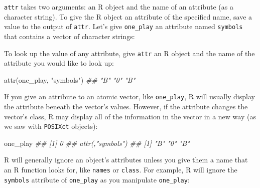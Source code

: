 \documentclass[
  letterpaper,
  DIV=11,
  numbers=noendperiod]{scrbook}
\newenvironment{Shaded}{\begin{snugshade}}{\end{snugshade}}
\newcommand{\DocumentationTok}[1]{\textcolor[rgb]{0.37,0.37,0.37}{\textit{#1}}}
\newcommand{\FunctionTok}[1]{\textcolor[rgb]{0.28,0.35,0.67}{#1}}
\newcommand{\NormalTok}[1]{\textcolor[rgb]{0.00,0.23,0.31}{#1}}
\newcommand{\OtherTok}[1]{\textcolor[rgb]{0.00,0.23,0.31}{#1}}
\newcommand{\StringTok}[1]{\textcolor[rgb]{0.13,0.47,0.30}{#1}}
\begin{document}
\texttt{attr} takes two arguments: an R object and the name of an
attribute (as a character string). To give the R object an attribute of
the specified name, save a value to the output of \texttt{attr}. Let's
give \texttt{one\_play} an attribute named \texttt{symbols} that
contains a vector of character strings:

\begin{Shaded}
\end{Shaded}

To look up the value of any attribute, give \texttt{attr} an R object
and the name of the attribute you would like to look up:

\begin{Shaded}
\begin{Highlighting}[]
\FunctionTok{attr}\NormalTok{(one\_play, }\StringTok{"symbols"}\NormalTok{)}
\DocumentationTok{\#\# "B" "0" "B"}
\end{Highlighting}
\end{Shaded}

If you give an attribute to an atomic vector, like \texttt{one\_play}, R
will usually display the attribute beneath the vector's values. However,
if the attribute changes the vector's class, R may display all of the
information in the vector in a new way (as we saw with \texttt{POSIXct}
objects):

\begin{Shaded}
\begin{Highlighting}[]
\NormalTok{one\_play}
\DocumentationTok{\#\# [1] 0}
\DocumentationTok{\#\# attr(,"symbols")}
\DocumentationTok{\#\# [1] "B" "0" "B"}
\end{Highlighting}
\end{Shaded}

R will generally ignore an object's attributes unless you give them a
name that an R function looks for, like \texttt{names} or
\texttt{class}. For example, R will ignore the \texttt{symbols}
attribute of \texttt{one\_play} as you manipulate \texttt{one\_play}:
\end{document}
